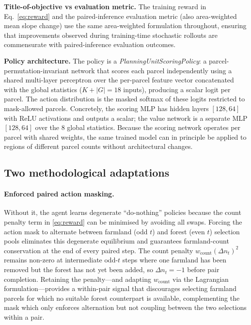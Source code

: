 \documentclass[]{interact}
\theoremstyle{plain}
\begin{document}
\textbf{Title-of-objective vs evaluation metric.} The training reward in Eq.~\eqref{eq:reward} and the paired-inference evaluation metric (also area-weighted mean slope change) use the same area-weighted formulation throughout, ensuring that improvements observed during training-time stochastic rollouts are commensurate with paired-inference evaluation outcomes.

\textbf{Policy architecture.} The policy is a \emph{PlanningUnitScoringPolicy}: a parcel-permutation-invariant network that scores each parcel independently using a shared multi-layer perceptron over the per-parcel feature vector concatenated with the global statistics ($K + |G| = 18$ inputs), producing a scalar logit per parcel. The action distribution is the masked softmax of these logits restricted to mask-allowed parcels. Concretely, the scoring MLP has hidden layers $[128, 64]$ with ReLU activations and outputs a scalar; the value network is a separate MLP $[128, 64]$ over the 8 global statistics. Because the scoring network operates per parcel with shared weights, the same trained model can in principle be applied to regions of different parcel counts without architectural changes.

\subsection{Two methodological adaptations}\label{sec:adapt}

\paragraph{Enforced paired action masking.} Without it, the agent learns degenerate ``do-nothing'' policies because the count penalty term in \eqref{eq:reward} can be minimised by avoiding all swaps. Forcing the action mask to alternate between farmland (odd $t$) and forest (even $t$) selection pools eliminates this degenerate equilibrium and guarantees farmland-count conservation at the end of every paired step. The count penalty $w_{\text{count}}(\Delta n_t)^2$ remains non-zero at intermediate odd-$t$ steps where one farmland has been removed but the forest has not yet been added, so $\Delta n_t = -1$ before pair completion. Retaining the penalty---and adapting $w_{\text{count}}$ via the Lagrangian formulation---provides a within-pair signal that discourages selecting farmland parcels for which no suitable forest counterpart is available, complementing the mask which only enforces alternation but not coupling between the two selections within a pair.
\end{document}

